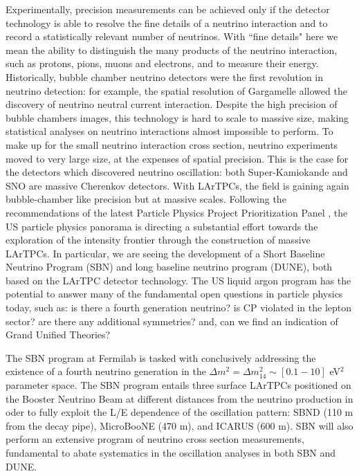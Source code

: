 Experimentally, precision measurements can be achieved only if the detector technology is able to resolve the fine details of a neutrino interaction and to record a statistically relevant number of neutrinos.  With ``fine details" here we mean the ability to distinguish the many products of the neutrino interaction, such as protons, pions, muons and electrons, and to measure their energy.
Historically,  bubble chamber neutrino detectors were the first revolution in neutrino detection: for example, the spatial resolution of Gargamelle allowed the discovery of neutrino neutral current interaction. Despite the high precision of bubble chambers images, this technology is hard to scale to massive size, making statistical analyses on neutrino interactions almost impossible to perform. To make up for the small neutrino interaction cross section, neutrino experiments moved to very large size, at the expenses of spatial precision. This is the case for the detectors which discovered neutrino oscillation:  both Super-Kamiokande and SNO are massive Cherenkov detectors. With LArTPCs, the field is gaining again bubble-chamber like precision but at massive scales. Following the recommendations of  the latest Particle Physics Project Prioritization Panel  \cite{P5}, the US particle physics panorama is directing a substantial effort towards the exploration of the intensity frontier through the construction of massive LArTPCs. In particular, we are seeing the development of a Short Baseline Neutrino Program (SBN) and long baseline neutrino program  (DUNE), both based on the LArTPC detector technology. The US liquid argon program has the potential to answer many of the fundamental open questions in particle physics today, such as: is there a fourth generation neutrino? is CP violated in the lepton sector? are there any additional symmetries? and, can we find an indication of Grand Unified Theories? 

The SBN program at Fermilab is tasked with conclusively addressing the existence of a fourth neutrino generation in the  $\Delta m^2= \Delta m^2_{14} \sim [0.1 - 10]$ eV$^2$ parameter space. The SBN program entails three surface LArTPCs positioned on the Booster Neutrino Beam at different distances from the neutrino production in oder to fully exploit  the L/E dependence of the oscillation pattern:  SBND (110 m from the decay pipe), MicroBooNE (470 m), and ICARUS (600 m). SBN will also perform an extensive 
program of neutrino cross section measurements, fundamental to abate systematics in the oscillation analyses in both SBN and DUNE.

